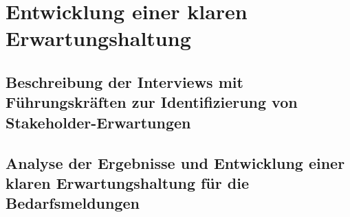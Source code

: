 \chapter{Entwicklung einer klaren Erwartungshaltung}
\label{chap:erwartungshaltung}

\section{Beschreibung der Interviews mit Führungskräften zur Identifizierung von Stakeholder-Erwartungen}
\label{sec:beschreibung-der-interviews}

\section{Analyse der Ergebnisse und Entwicklung einer klaren Erwartungshaltung für die Bedarfsmeldungen}
\newpage